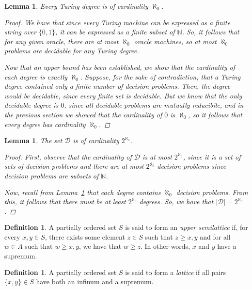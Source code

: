 \documentclass[psamsfonts]{amsart}
\newtheorem{lem}[thm]{Lemma}
\theoremstyle{definition}
\newtheorem{defn}[thm]{Definition}
\theoremstyle{remark}
\numberwithin{equation}{section}
\begin{document}
\begin{lem}
  \label{lem:deg_count}
  Every Turing degree is of cardinality $\aleph_0$.
  \begin{proof}
    We have that since every Turing machine can be expressed as a finite string over
    $\{0,1\}$, it can be expressed as a finite subset of $\mathbb{N}$. So, it follows
    that for any given oracle, there are at most $\aleph_0$ oracle machines, so
    at most $\aleph_0$ problems are decidable for any Turing degree.
    \par
    Now that an upper bound has been established, we show that the cardinality
    of each degree is exactly $\aleph_0$. Suppose, for the sake of contradiction,
    that a Turing degree contained only a finite number of decision
    problems. Then, the degree would be decidable, since every finite set is
    decidable. But we know that the only decidable degree is $0$, since all
    decidable problems are mutually reducibile, and in the previous section we
    showed that the cardinality of $0$ is $\aleph_0$, so it follows that every
    degree has cardinality $\aleph_0$.
  \end{proof}
\end{lem}


\begin{lem}
  The set $\mathcal{D}$ is of cardinality $2^{\aleph_0}$.
  \begin{proof}
    First, observe that the cardinality of $\mathcal{D}$ is at most
    $2^{\aleph_0}$, since it is a set of sets of decision problems and there are
    at most $2^{\aleph_0}$ decision problems since decision problems are subsets
    of $\mathbb{N}$.\par Now, recall from Lemma~\ref{lem:deg_count} that each
    degree contains $\aleph_0$ decision problems. From this, it follows that
    there must be at least $2^{\aleph_0}$ degrees. So, we have that $\lvert \mathcal{D} \rvert=2^{\aleph_0}$.
  \end{proof}
\end{lem}

\begin{defn}
  A partially ordered set $S$ is said to form an \emph{upper semilattice} if, for every
 $x,y\in S$, there exists some element $z\in S$ such that $z \geq x,y$ and
 for all $w\in A$ such that $w\geq x,y$, we have that $w \geq z$. In other
 words, $x$ and $y$ have a supremum.
\end{defn}

\begin{defn}
  A partially ordered set $S$ is said to form a \emph{lattice} if all pairs
  $\{x,y\}\in S$ have both an infinum and a supremum.
\end{defn}
\end{document}
